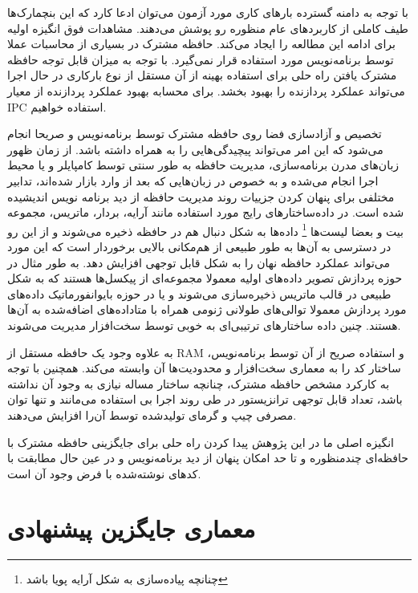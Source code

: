 \documentclass{thesis}
\begin{document}
با توجه به دامنه گسترده بارهای کاری مورد آزمون می‌توان ادعا کارد که این
بنچمارک‌ها طیف
کاملی
از کاربردهای عام منظوره رو پوشش می‌دهند. مشاهدات فوق انگیزه اولیه برای ادامه
این مطالعه را ایجاد می‌کند. حافظه مشترک در بسیاری از محاسبات عملا توسط
برنامه‌نویس مورد استفاده قرار نمی‌گیرد. با توجه به میزان قابل توجه حافظه مشترک
یافتن راه حلی برای استفاده بهینه از آن مستقل از نوع بارکاری در حال اجرا
می‌تواند عملکرد پردازنده را بهبود بخشد. برای  محسابه بهبود عملکرد پردازنده از
معیار
IPC
استفاده خواهیم.

تخصیص و آزاد‌سازی فضا روی حافظه مشترک توسط برنامه‌نویس و صریحا انجام می‌شود که
این امر می‌تواند پیچیدگی‌هایی را به همراه داشته باشد.
از زمان ظهور زبان‌های مدرن برنامه‌سازی، مدیریت حافظه به طور سنتی توسط کامپایلر
و یا محیط اجرا
انجام می‌شده و به خصوص در زبان‌هایی که بعد از 
وارد بازار شده‌اند، تدابیر مختلفی برای پنهان کردن جزییات روند مدیریت
حافظه از دید برنامه نویس اندیشیده شده است.
در داده‌ساختار‌های رایج مورد استفاده مانند آرایه، بردار، ماتریس، مجموعه بیت و
بعضا
لیست‌ها
\footnote{%
چنانچه پیاده‌سازی به شکل
آرایه پویا باشد
}
داده‌ها به شکل دنبال هم در حافظه ذخیره می‌شوند و از این رو در دسترسی به آن‌ها
 به طور طبیعی از
هم‌مکانی
بالایی برخوردار است که این مورد می‌تواند عملکرد حافظه نهان را به شکل قابل توجهی
افزایش دهد. به طور مثال در حوزه پردازش تصویر داده‌های اولیه معمولا مجموعه‌ای از
پیکسل‌ها هستند که به شکل طبیعی در قالب ماتریس ذخیره‌سازی می‌شوند و یا در
حوزه بایوانفورماتیک داده‌های مورد پردازش معمولا توالی‌های طولانی
ژنومی همراه با متاداده‌های اضافه‌شده به آن‌ها هستند. چنین داده ساختار‌های
ترتیبی‌ای
به خوبی توسط سخت‌افزار مدیریت می‌شوند.

  به علاوه وجود یک حافظه مستقل از
RAM
و استفاده صریح از آن توسط برنامه‌نویس، ساختار کد را به معماری
سخت‌افزار و محدودیت‌ها آن وابسته می‌کند. همچنین با توجه به کارکرد مشخص 
حافظه مشترک،
چنانچه
ساختار
مساله نیازی به وجود آن نداشته باشد، تعداد قابل توجهی ترانزیستور در طی
روند اجرا بی ‌استفاده می‌مانند
و تنها توان مصرفی چیپ و گرمای تولید‌شده توسط آن‌را افزایش می‌دهند.

انگیزه اصلی ما در این پژوهش پیدا کردن راه حلی برای جایگزینی حافظه مشترک با
حافظه‌ای چند‌منظوره و تا حد امکان پنهان از دید برنامه‌نویس و در عین حال مطابقت
با کدهای نوشته‌شده با فرض وجود آن است. 


\section{
معماری جایگزین پیشنهادی
}
\end{document}
